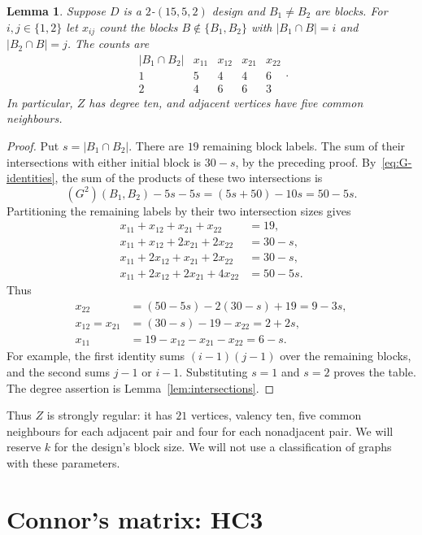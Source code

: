 \documentclass[11pt]{article}
\newtheorem{lemma}[theorem]{Lemma}
\theoremstyle{definition}
\begin{document}
\begin{lemma}\label{lem:common}
\textup{\cite[Lemma 4.2, at $k=5$]{HC}}
Suppose $D$ is a $2$-$(15,5,2)$ design and $B_1\ne B_2$ are blocks.
For $i,j\in\{1,2\}$ let $x_{ij}$ count the blocks $B\notin\{B_1,B_2\}$
with $|B_1\cap B|=i$ and $|B_2\cap B|=j$. The counts are
\[
\begin{array}{c|rrrr}
 |B_1\cap B_2|&x_{11}&x_{12}&x_{21}&x_{22}\\ \hline
 1&5&4&4&6\\
 2&4&6&6&3
\end{array}.
\]
In particular, $Z$ has degree ten, and adjacent vertices have five
common neighbours.
\end{lemma}
\begin{proof}
Put $s=|B_1\cap B_2|$. There are $19$ remaining block labels.
The sum of their intersections with either initial block is $30-s$,
by the preceding proof. By~\eqref{eq:G-identities}, the sum of the
products of these two intersections is
\[
 (G^2)(B_1,B_2)-5s-5s=(5s+50)-10s=50-5s.
\]
Partitioning the remaining labels by their two intersection sizes gives
\[
\begin{aligned}
 x_{11}+x_{12}+x_{21}+x_{22}&=19,\\
 x_{11}+x_{12}+2x_{21}+2x_{22}&=30-s,\\
 x_{11}+2x_{12}+x_{21}+2x_{22}&=30-s,\\
 x_{11}+2x_{12}+2x_{21}+4x_{22}&=50-5s.
\end{aligned}
\]
Thus
\[
\begin{aligned}
 x_{22}&=(50-5s)-2(30-s)+19=9-3s,\\
 x_{12}=x_{21}&=(30-s)-19-x_{22}=2+2s,\\
 x_{11}&=19-x_{12}-x_{21}-x_{22}=6-s.
\end{aligned}
\]
For example, the first identity sums $(i-1)(j-1)$ over the remaining
blocks, and the second sums $j-1$ or $i-1$. Substituting $s=1$ and
$s=2$ proves the table. The degree assertion is
Lemma~\ref{lem:intersections}.
\end{proof}

Thus $Z$ is strongly regular: it has $21$ vertices, valency ten,
five common neighbours for each adjacent pair and four for each
nonadjacent pair. We will reserve $k$ for the design's block size.
We will not use a classification of graphs with these parameters.

\section{Connor's matrix: HC3}
\end{document}
